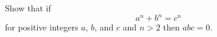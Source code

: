 \documentclass[a4paper,12pt]{exam}
\begin{document}
\begin{questions}
\question Show that if \[a^n+b^n=c^n\] for positive integers \(a\), \(b\), and \(c\) and \(n>2\)
then \(abc=0\).
\end{questions}
\end{document}
